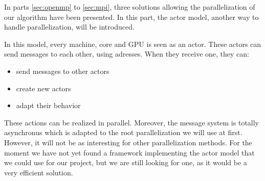 In parts \ref{sec:openmp} to \ref{sec:mpi}, three solutions allowing the parallelization of our algorithm have been presented. In this part, the actor model, another way to handle parallelization, will be introduced.

In this model, every machine, core and GPU is seen as an actor. These actors can send messages to each other, using adresses. When they receive one, they can:
\begin{itemize}
\item send messages to other actors
\item create new actors
\item adapt their behavior
\end{itemize}

These actions can be realized in parallel. Moreover, the message system is totally asynchronus which is adapted to the root parallelization we will use at first. However, it will not be as interesting for other parallelization methods. For the moment we have not yet found a framework implementing the actor model that we could use for our project, but we are still looking for one, as it would be a very efficient solution. 